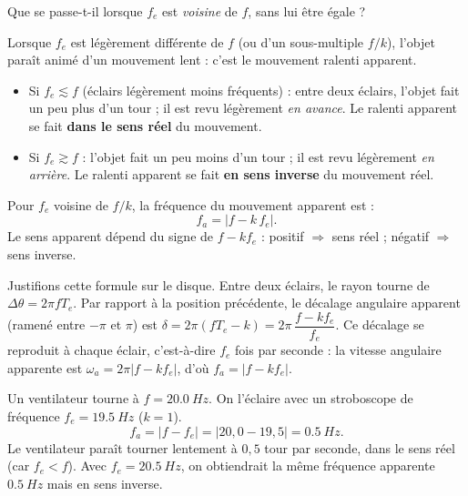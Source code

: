 \documentclass[11pt]{article}
\newcommand{\cle}[1]{{\popxbold\color{popdark}#1}}
\newcounter{popsec}
\newcounter{popsub}
\newcommand{\courssub}[1]{%
  \stepcounter{popsub}%
  \par\vspace{9pt}\noindent{\popxbold\fontsize{11.5}{13}\selectfont\color{popink}{\color{poporange}\thepopsec.\thepopsub}\hspace{6pt}#1}\par\nopagebreak\vspace{4pt}
}
\begin{document}
\courssub{Mouvement ralenti apparent}

Que se passe-t-il lorsque $f_e$ est \emph{voisine} de $f$, sans lui être égale ?

\begin{definition}
Lorsque $f_e$ est légèrement différente de $f$ (ou d'un sous-multiple $f/k$), l'objet paraît animé d'un mouvement lent : c'est le \cle{mouvement ralenti apparent}.
\begin{itemize}
\item Si $f_e \lesssim f$ (éclairs légèrement moins fréquents) : entre deux éclairs, l'objet fait un peu plus d'un tour ; il est revu légèrement \emph{en avance}. Le ralenti apparent se fait \textbf{dans le sens réel} du mouvement.
\item Si $f_e \gtrsim f$ : l'objet fait un peu moins d'un tour ; il est revu légèrement \emph{en arrière}. Le ralenti apparent se fait \textbf{en sens inverse} du mouvement réel.
\end{itemize}
\end{definition}

\begin{propriete}
Pour $f_e$ voisine de $f/k$, la fréquence du mouvement apparent est :
\[ f_a = \left| f - k\, f_e \right|. \]
Le sens apparent dépend du signe de $f - k f_e$ : positif $\Rightarrow$ sens réel ; négatif $\Rightarrow$ sens inverse.
\end{propriete}

Justifions cette formule sur le disque. Entre deux éclairs, le rayon tourne de $\Delta\theta = 2\pi f T_e$. Par rapport à la position précédente, le décalage angulaire apparent (ramené entre $-\pi$ et $\pi$) est $\delta = 2\pi(f T_e - k) = 2\pi\,\dfrac{f - k f_e}{f_e}$. Ce décalage se reproduit à chaque éclair, c'est-à-dire $f_e$ fois par seconde : la vitesse angulaire apparente est $\omega_a = 2\pi |f - k f_e|$, d'où $f_a = |f - k f_e|$.

\begin{exemplebox}
Un ventilateur tourne à $f = \SI{20,0}{Hz}$. On l'éclaire avec un stroboscope de fréquence $f_e = \SI{19,5}{Hz}$ ($k = 1$).
\[ f_a = |f - f_e| = |20,0 - 19,5| = \SI{0,5}{Hz}. \]
Le ventilateur paraît tourner lentement à $0,5$ tour par seconde, dans le sens réel (car $f_e < f$). Avec $f_e = \SI{20,5}{Hz}$, on obtiendrait la même fréquence apparente $\SI{0,5}{Hz}$ mais en sens inverse.
\end{exemplebox}
\end{document}
